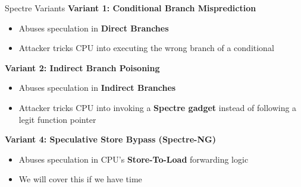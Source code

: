 \documentclass[10pt, dvipsnames, aspectratio=169]{beamer}
\begin{document}
\begin{frame}[c]{Spectre Variants}{}
  {\bf Variant 1: Conditional Branch Misprediction}
  \begin{itemize}
    \item Abuses speculation in {\bf\color{blue}Direct Branches}
    \item Attacker tricks CPU into executing the wrong branch of a conditional
  \end{itemize}

  \vfill
  {\bf Variant 2: Indirect Branch Poisoning}
  \begin{itemize}
    \item Abuses speculation in {\bf\color{orange}Indirect Branches}
    \item Attacker tricks CPU into invoking a {\bf Spectre gadget} instead of following a legit function pointer
  \end{itemize}

  \vfill
  {\bf Variant 4: Speculative Store Bypass (Spectre-NG)}
  \begin{itemize}
    \item Abuses speculation in CPU's {\bf\color{green}Store-To-Load} forwarding logic
    \item We will cover this if we have time
  \end{itemize}
\end{frame}
\end{document}

